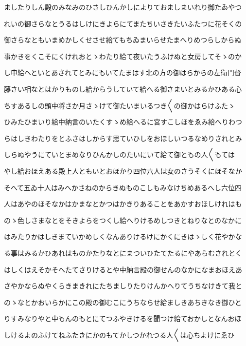 \documentclass[a4paper,11pt,landscape]{ltjtarticle}
\begin{document}
\par\medskip
ましたりしん殿のみなみのひさしひんかしによりておましまいれり御たゐやつ
\par\medskip
れいの御さらなとうるはしけにきよらにてまたちいさきたいふたつに花そくの
\par\medskip
御さらなともいまめかしくせさせ給てもちゐまいらせたまへりめつらしからぬ
\par\medskip
事かきをくこそにくけれおとゝわたり給て夜いたうふけぬと女房してそゝのか
\par\medskip
し申給へといとあされてとみにもいてたまはす北の方の御はらからの左衛門督
\par\medskip
藤さい相なとはかりものし給からうしていて給へる御さまいとみるかひある心
\par\medskip
ちすあるしの頭中将さか月さゝけて御たいまいるつき〱の御かはらけふたゝ
\par\medskip
ひみたひまいり給中納言のいたくすゝめ給へるに宮すこしほをゑみ給へりわつ
\par\medskip
らはしきわたりをとふさはしからす思ていひしをおほしいつるなめりされとみ
\par\medskip
しらぬやうにていとまめなりひんかしのたいにいて給て御ともの人〱もては
\par\medskip
やし給おほえある殿上人ともいとおほかり四位六人は女のさうそくにほそなか
\par\medskip
そへて五ゐ十人はみへかさねのからきぬものこしもみなけちめあるへし六位四
\par\medskip
人はあやのほそなかはかまなとかつはかきりあることをあかすおほしけれはも
\par\medskip
のゝ色しさまなとをそきよらをつくし給へりけるめしつきとねりなとのなかに
\par\medskip
はみたりかはしきまていかめしくなんありけるけにかくにきはゝしく花やかな
\par\medskip
る事はみるかひあれはものかたりなとにまついひたてたるにやあらむされとく
\par\medskip
はしくはえそかそへたてさりけるとや中納言殿の御せんのなかになまおほえあ
\par\medskip
さやかならぬやくらきまきれにたちましりたりけんかへりてうちなけきて我と
\par\medskip
のゝなとかおいらかにこの殿の御むこにうちならせ給ましきあちきなき御ひと
\par\medskip
りすみなりやと中もんのもとにてつふやきけるを聞つけ給ておかしとなんおほ
\par\medskip
しけるよのふけてねふたきにかのもてかしつかれつる人〱は心ちよけにゑひ
\par\medskip
\end{document}
